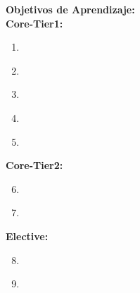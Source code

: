 \noindent \textbf{Objetivos de Aprendizaje:}\\
\noindent \textbf{Core-Tier1:}
\begin{enumerate}
	\setcounter{enumi}{0}
	\item \GVFundamentalConceptsLOIdentifyCommon\xspace[\GVFundamentalConceptsLOIdentifyCommonLevel]\label{sec:BOK:GVFundamentalConceptsLOIdentifyCommon}
	\item \GVFundamentalConceptsLOExplainIn\xspace[\GVFundamentalConceptsLOExplainInLevel]\label{sec:BOK:GVFundamentalConceptsLOExplainIn}
	\item \GVFundamentalConceptsLOExplainHowOf\xspace[\GVFundamentalConceptsLOExplainHowOfLevel]\label{sec:BOK:GVFundamentalConceptsLOExplainHowOf}
	\item \GVFundamentalConceptsLOConstruct\xspace[\GVFundamentalConceptsLOConstructLevel]\label{sec:BOK:GVFundamentalConceptsLOConstruct}
	\item \GVFundamentalConceptsLODescribeTheLossy\xspace[\GVFundamentalConceptsLODescribeTheLossyLevel]\label{sec:BOK:GVFundamentalConceptsLODescribeTheLossy}
\end{enumerate}
\noindent \textbf{Core-Tier2:}
\begin{enumerate}
	\setcounter{enumi}{5}
	\item \GVFundamentalConceptsLODescribeColor\xspace[\GVFundamentalConceptsLODescribeColorLevel]\label{sec:BOK:GVFundamentalConceptsLODescribeColor}
	\item \GVFundamentalConceptsLODescribeTheStoring\xspace[\GVFundamentalConceptsLODescribeTheStoringLevel]\label{sec:BOK:GVFundamentalConceptsLODescribeTheStoring}
\end{enumerate}
\noindent \textbf{Elective:}
\begin{enumerate}
	\setcounter{enumi}{7}
	\item \GVFundamentalConceptsLODescribeTheOfMotion\xspace[\GVFundamentalConceptsLODescribeTheOfMotionLevel]\label{sec:BOK:GVFundamentalConceptsLODescribeTheOfMotion}
	\item \GVFundamentalConceptsLODescribeHowCanFrom\xspace[\GVFundamentalConceptsLODescribeHowCanFromLevel]\label{sec:BOK:GVFundamentalConceptsLODescribeHowCanFrom}
\end{enumerate}


